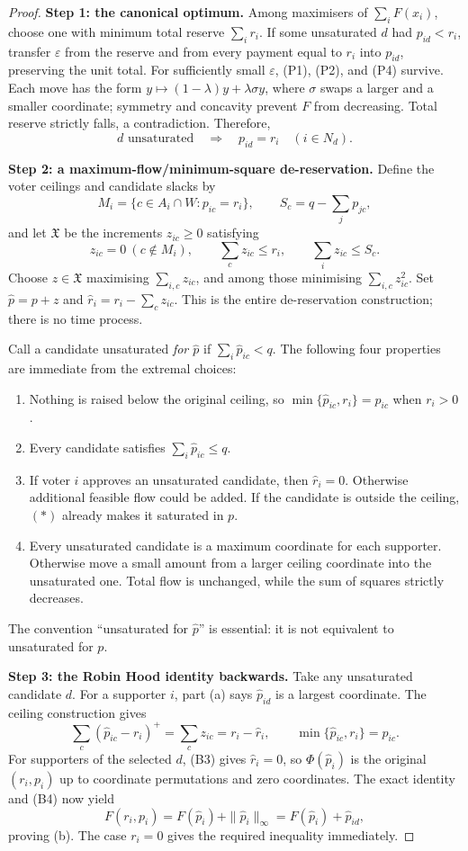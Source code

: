 \documentclass[11pt,a4paper]{article}
\theoremstyle{definition}
\theoremstyle{remark}
\begin{document}
\begin{proof}
\textbf{Step 1: the canonical optimum.} Among maximisers of $\sum_iF(x_i)$, choose one with minimum total reserve $\sum_ir_i$. If some unsaturated $d$ had $p_{id}<r_i$, transfer $\varepsilon$ from the reserve and from every payment equal to $r_i$ into $p_{id}$, preserving the unit total. For sufficiently small $\varepsilon$, (P1), (P2), and (P4) survive. Each move has the form $y\mapsto(1-\lambda)y+\lambda\sigma y$, where $\sigma$ swaps a larger and a smaller coordinate; symmetry and concavity prevent $F$ from decreasing. Total reserve strictly falls, a contradiction. Therefore,
\[
d\text{ unsaturated}\quad\Longrightarrow\quad p_{id}=r_i\quad(i\in N_d). \tag{$*$}
\]

\textbf{Step 2: a maximum-flow/minimum-square de-reservation.} Define the voter ceilings and candidate slacks by
\[
M_i=\{c\in A_i\cap W:p_{ic}=r_i\},\qquad
S_c=q-\sum_jp_{jc},
\]
and let $\mathfrak X$ be the increments $z_{ic}\ge0$ satisfying
\[
z_{ic}=0\ (c\notin M_i),\qquad
\sum_cz_{ic}\le r_i,\qquad
\sum_iz_{ic}\le S_c.
\]
Choose $z\in\mathfrak X$ maximising $\sum_{i,c}z_{ic}$, and among those minimising $\sum_{i,c}z_{ic}^2$. Set $\hat p=p+z$ and $\hat r_i=r_i-\sum_cz_{ic}$. This is the entire de-reservation construction; there is no time process.

Call a candidate unsaturated \emph{for $\hat p$} if $\sum_i\hat p_{ic}<q$. The following four properties are immediate from the extremal choices:
\begin{enumerate}[label=(B\arabic*)]
\item Nothing is raised below the original ceiling, so $\min\{\hat p_{ic},r_i\}=p_{ic}$ when $r_i>0$.
\item Every candidate satisfies $\sum_i\hat p_{ic}\le q$.
\item If voter $i$ approves an unsaturated candidate, then $\hat r_i=0$. Otherwise additional feasible flow could be added. If the candidate is outside the ceiling, $(*)$ already makes it saturated in $p$.
\item Every unsaturated candidate is a maximum coordinate for each supporter. Otherwise move a small amount from a larger ceiling coordinate into the unsaturated one. Total flow is unchanged, while the sum of squares strictly decreases.
\end{enumerate}
The convention ``unsaturated for $\hat p$'' is essential: it is not equivalent to unsaturated for $p$.

\textbf{Step 3: the Robin Hood identity backwards.} Take any unsaturated candidate $d$. For a supporter $i$, part (a) says $\hat p_{id}$ is a largest coordinate. The ceiling construction gives
\[
\sum_c(\hat p_{ic}-r_i)^+
=\sum_cz_{ic}=r_i-\hat r_i,
\qquad \min\{\hat p_{ic},r_i\}=p_{ic}.
\]
For supporters of the selected $d$, (B3) gives $\hat r_i=0$, so $\Phi(\hat p_i)$ is the original $(r_i,p_i)$ up to coordinate permutations and zero coordinates. The exact identity and (B4) now yield
\[
F(r_i,p_i)=F(\hat p_i)+\|\hat p_i\|_\infty
=F(\hat p_i)+\hat p_{id},
\]
proving (b). The case $r_i=0$ gives the required inequality immediately.
\end{proof}
\end{document}
